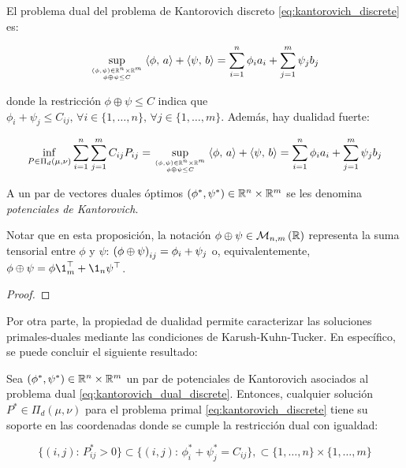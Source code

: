 \begin{prop}
	\label{prop:duality_discrete}
	El problema dual del problema de Kantorovich discreto \eqref{eq:kantorovich_discrete} es:

	\begin{equation}
		\label{eq:kantorovich_dual_discrete}
		\sup_{\feasible{(\phi,\psi)\in\R^n\times\R^m} {\phi\oplus \psi \leq C}}
		\dotproduct{\phi}{a} + \dotproduct{\psi}{b} = \sum_{i=1}^n \phi_i a_i + \sum_{j=1}^m \psi_j b_j
	\end{equation}

	donde la restricción $\phi\oplus \psi \leq C$ indica que $\phi_i+\psi_j \leq C_{ij}, \, \forall i\in\{1,\ldots,n\}, \, \forall j\in\{1,\ldots,m\}$. Además, hay dualidad fuerte:

	\begin{equation}
		\label{eq:kantorovich_strong_duality_discrete}
		\inf_{P\in \Pi_d(\mu,\nu)} \sum_{i=1}^{n}\sum_{j=1}^{m} C_{ij}P_{ij}
		= \sup_{\feasible{(\phi,\psi)\in\R^n\times\R^m}{\phi\oplus \psi \leq C}}
		\dotproduct{\phi}{a} + \dotproduct{\psi}{b} = \sum_{i=1}^n \phi_i a_i + \sum_{j=1}^m \psi_j b_j
	\end{equation}

	A un par de vectores duales óptimos $(\phi^*,\psi^*)\in\mathbb{R}^n\times\mathbb{R}^m$ se les denomina \textit{potenciales de Kantorovich}.
\end{prop}

Notar que en esta proposición, la notación $\phi\oplus\psi\in\mathcal{M}_{n,m}\left(\mathbb{R}\right)$ representa la suma tensorial entre $\phi$ y $\psi$: $\left(\phi\oplus\psi\right)_{ij}=\phi_i+\psi_j$ o, equivalentemente, $\phi\oplus\psi = \phi\1_m^\top + \1_n \psi^\top$.

\begin{proof}
\end{proof}

Por otra parte, la propiedad de dualidad permite caracterizar las soluciones primales-duales mediante las condiciones de Karush-Kuhn-Tucker. En específico, se puede concluir el siguiente resultado:

\begin{cor}
	Sea $(\phi^*,\psi^*)\in\mathbb{R}^n\times\mathbb{R}^m$ un par de potenciales de Kantorovich asociados al problema dual \eqref{eq:kantorovich_dual_discrete}. Entonces, cualquier solución $P^*\in\Pi_d(\mu,\nu)$ para el problema primal \eqref{eq:kantorovich_discrete} tiene su soporte en las coordenadas donde se cumple la restricción dual con igualdad:

	\begin{equation}
		\{(i,j):\,P_{ij}^*>0\}
		\subset \{(i,j):\, \phi^*_i + \psi^*_j = C_{ij}\},
		\subset \{1,\ldots,n\}\times\{1,\ldots,m\}
	\end{equation}

\end{cor}


